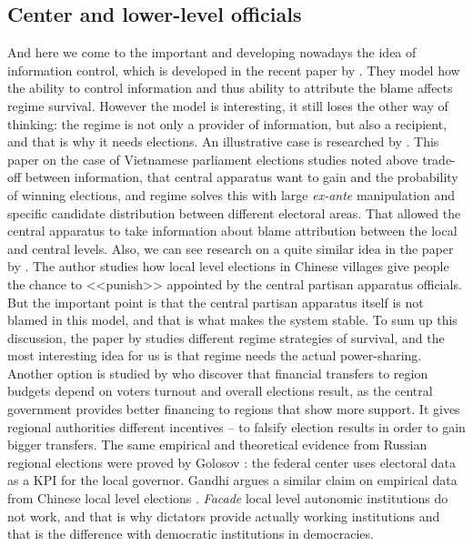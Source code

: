 \documentclass[a4paper, 12pt]{article}
\begin{document}
    
	\subsection*{Center and lower-level officials}
	And here we come to the important and developing nowadays the idea of information control, which is developed in the recent paper by \cite{inform}. They model how the ability to control information and thus ability to attribute the blame affects regime survival. However the model is interesting, it still loses the other way of thinking: the regime is not only a provider of information, but also a recipient, and that is why it needs elections. An illustrative case is researched by \cite{vietnam}. This paper on the case of Vietnamese parliament elections studies noted above trade-off between information, that central apparatus want to gain and the probability of winning elections, and regime solves this with large \textit{ex-ante} manipulation and specific candidate distribution between different electoral areas. That allowed the central apparatus to take information about blame attribution between the local and central levels. Also, we can see research on a quite similar idea in the paper by \cite{china}. The author studies how local level elections in Chinese villages give people the chance to <<punish>> appointed by the central partisan apparatus officials. But the important point is that the central partisan apparatus itself is not blamed in this model, and that is what makes the system stable. To sum up this discussion, the paper by \cite{power_sharing} studies different regime strategies of survival, and the most interesting idea for us is that regime needs the actual power-sharing.
	Another option is studied by \cite{russianregons} who discover that financial transfers to region budgets depend on voters turnout and overall elections result, as the central government provides better financing to regions that show more support. It gives regional authorities different incentives -- to falsify election results in order to gain bigger transfers. The same empirical and theoretical evidence from Russian regional elections were proved by Golosov \parencite{golosov}: the federal center uses electoral data as a KPI for the local governor. Gandhi argues a similar claim on empirical data from Chinese local level elections \parencite{localfraud}. \textit{Facade} local level autonomic institutions do not work, and that is why dictators provide actually working institutions and that is the difference with democratic institutions in democracies.
\end{document}
